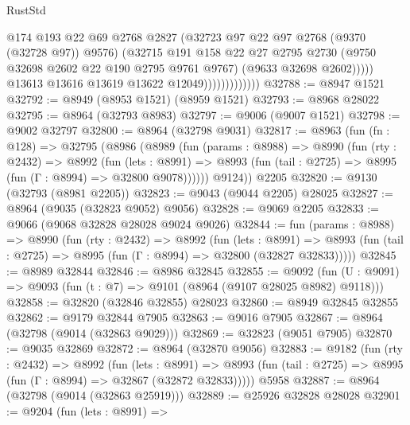 \begin{lexlean}{RustStd}
\begin{coremodule}
                                    @174
                                    @193
                                    @22
                                    @69
                                    @2768
                                    @2827
                                    (@32723 @97 @22 @97 @2768 (@9370 (@32728 @97)) @9576)
                                    (@32715
                                      @191
                                      @158
                                      @22
                                      @27
                                      @2795
                                      @2730
                                      (@9750 @32698 @2602 @22 @190 @2795 @9761 @9767)
                                      (@9633 @32698 @2602)))))
                              @13613
                              @13616
                              @13619
                              @13622
                              @12049)))))))))))))
@32788 := @8947 @1521
@32792 := @8949 (@8953 @1521) (@8959 @1521)
@32793 := @8968 @28022
@32795 := @8964 (@32793 @8983)
@32797 := @9006 (@9007 @1521)
@32798 := @9002 @32797
@32800 := @8964 (@32798 @9031)
@32817 := @8963
    (fun (fn : @128) =>
    @32795
      (@8986
        (@8989
          (fun (params : @8988) =>
          @8990
            (fun (rty : @2432) =>
            @8992
              (fun (lets : @8991) =>
              @8993 (fun (tail : @2725) => @8995 (fun (Γ : @8994) => @32800 @9078))))))
        @9124))
    @2205
@32820 := @9130 (@32793 (@8981 @2205))
@32823 := @9043 (@9044 @2205) @28025
@32827 := @8964 (@9035 (@32823 @9052) @9056)
@32828 := @9069 @2205
@32833 := @9066 (@9068 @32828 @28028 @9024 @9026)
@32844 := fun (params : @8988) =>
  @8990
    (fun (rty : @2432) =>
    @8992
      (fun (lets : @8991) =>
      @8993 (fun (tail : @2725) => @8995 (fun (Γ : @8994) => @32800 (@32827 @32833)))))
@32845 := @8989 @32844
@32846 := @8986 @32845
@32855 := @9092
    (fun (U : @9091) => @9093 (fun (t : @7) => @9101 (@8964 (@9107 @28025 @8982) @9118)))
@32858 := @32820 (@32846 @32855) @28023
@32860 := @8949 @32845 @32855
@32862 := @9179 @32844 @7905
@32863 := @9016 @7905
@32867 := @8964 (@32798 (@9014 (@32863 @9029)))
@32869 := @32823 (@9051 @7905)
@32870 := @9035 @32869
@32872 := @8964 (@32870 @9056)
@32883 := @9182
    (fun (rty : @2432) =>
    @8992
      (fun (lets : @8991) =>
      @8993 (fun (tail : @2725) => @8995 (fun (Γ : @8994) => @32867 (@32872 @32833)))))
    @5958
@32887 := @8964 (@32798 (@9014 (@32863 @25919)))
@32889 := @25926 @32828 @28028
@32901 := @9204
    (fun (lets : @8991) =>

\end{coremodule}
\end{lexlean}
